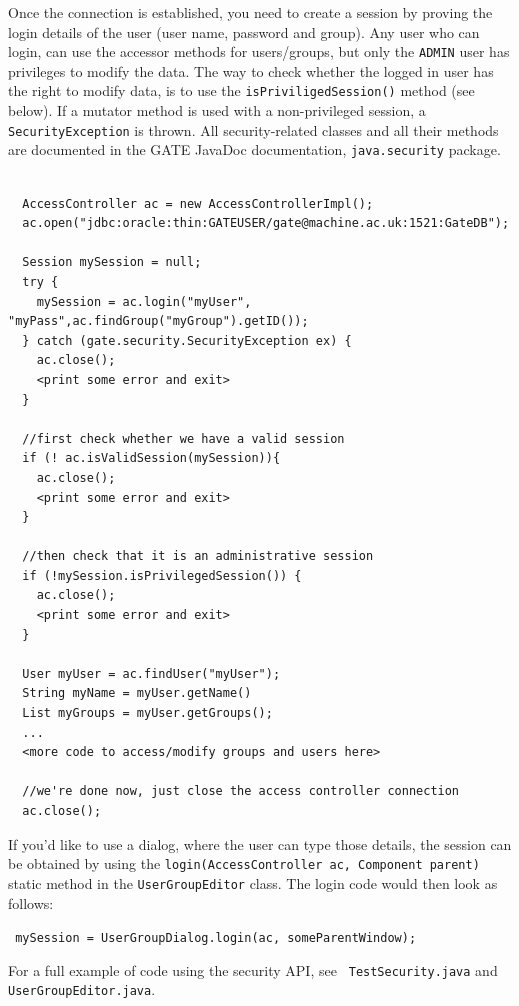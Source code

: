 Once the connection is established, you need to create a session by
proving the login details of the user (user name, password and group).
Any user who can login, can use the accessor methods for users/groups,
but only the {\tt ADMIN} user has privileges to modify the data. The way
to check whether the logged in user has the right to modify data, is to
use the {\tt isPriviligedSession()} method (see below). If a mutator
method is used with a non-privileged session, a {\tt SecurityException} is
thrown. All security-related classes and all their methods are
documented in the GATE JavaDoc documentation, {\tt java.security}
package.
%
\nsmall
\begin{verbatim}

  AccessController ac = new AccessControllerImpl();
  ac.open("jdbc:oracle:thin:GATEUSER/gate@machine.ac.uk:1521:GateDB");

  Session mySession = null;
  try {
    mySession = ac.login("myUser", "myPass",ac.findGroup("myGroup").getID());
  } catch (gate.security.SecurityException ex) {
    ac.close();
    <print some error and exit>
  }

  //first check whether we have a valid session
  if (! ac.isValidSession(mySession)){
    ac.close();
    <print some error and exit>
  }

  //then check that it is an administrative session
  if (!mySession.isPrivilegedSession()) {
    ac.close();
    <print some error and exit>
  }

  User myUser = ac.findUser("myUser");
  String myName = myUser.getName()
  List myGroups = myUser.getGroups();
  ...
  <more code to access/modify groups and users here>

  //we're done now, just close the access controller connection
  ac.close();

\end{verbatim}
\nnormalsize
%
If you'd like to use a dialog, where the user can type those details,
the session can be obtained by using the {\tt login(AccessController ac,
Component parent)} static method in the {\tt UserGroupEditor} class. The
login code would then look as follows:

{\tt
  mySession = UserGroupDialog.login(ac, someParentWindow);
}

For a full example of code using the security API, see {\tt
TestSecurity.java} and {\tt UserGroupEditor.java}.
